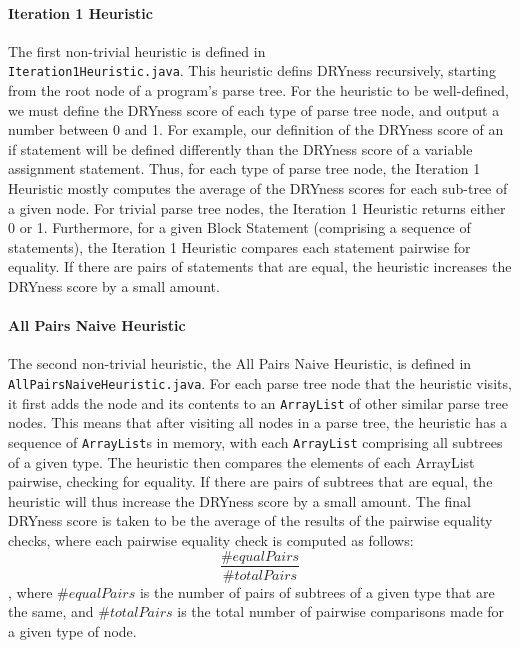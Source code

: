 \documentclass{article}
\begin{document}
\paragraph{Iteration 1 Heuristic}

The first non-trivial heuristic is defined in \\\texttt{Iteration1Heuristic.java}. This heuristic defins DRYness recursively, 
starting from the root node of a program's parse tree. For the heuristic to be well-defined, we must define the DRYness score of
each type of parse tree node, and output a number between 0 and 1. For example, our definition of the DRYness score of an if statement
will be defined differently than the DRYness score of a variable assignment statement. Thus, for each type of parse tree node,
the Iteration 1 Heuristic mostly computes the average of the DRYness scores for each sub-tree of a given node. For trivial parse
tree nodes, the Iteration 1 Heuristic returns either 0 or 1. Furthermore, for a given Block Statement (comprising a sequence of statements), 
the Iteration 1 Heuristic compares each statement pairwise for equality. If there are pairs of statements that are equal, the 
heuristic increases the DRYness score by a small amount.

\paragraph{All Pairs Naive Heuristic}

The second non-trivial heuristic, the All Pairs Naive Heuristic, is defined in \texttt{AllPairsNaiveHeuristic.java}. 
For each parse tree node that the heuristic visits, it first adds the node and its contents to an \texttt{ArrayList} of other similar
parse tree nodes. This means that after visiting all nodes in a parse tree, the heuristic has a sequence of \texttt{ArrayList}s
in memory, with each \texttt{ArrayList} comprising all subtrees of a given type. The heuristic then compares the elements of each
ArrayList pairwise, checking for equality. If there are pairs of subtrees that are equal, the heuristic will thus increase the
DRYness score by a small amount. The final DRYness score is taken to be the average of the results of the pairwise equality checks,
where each pairwise equality check is computed as follows: $$\frac{\#equalPairs}{\#totalPairs}$$, where $\#equalPairs$ is the
number of pairs of subtrees of a given type that are the same, and $\#totalPairs$ is the total number of pairwise comparisons made
for a given type of node.
\end{document}
